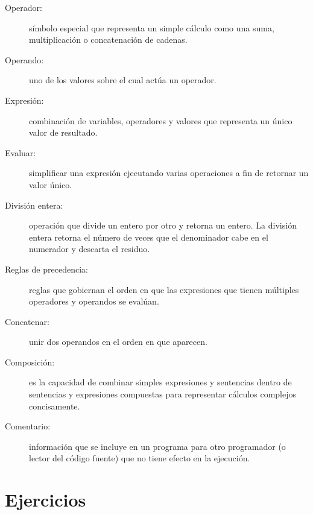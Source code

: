 \begin{description}
\item[Operador:]  símbolo especial que representa un simple cálculo como
una suma, multiplicación o concatenación de cadenas.

\item[Operando:]  uno de los valores sobre el cual actúa un operador.

\item[Expresión:]  combinación de variables, operadores y valores que 
representa un único valor de resultado.

\item[Evaluar:]  simplificar una expresión ejecutando varias operaciones a fin
de retornar un valor único.

\item[División entera:]  operación que divide un entero por otro
y retorna un entero. La división entera retorna el número de veces que 
el denominador cabe en el numerador y descarta el residuo.

\item[Reglas de precedencia:] reglas que gobiernan el orden en que
las expresiones que tienen múltiples operadores y operandos se evalúan.

\item[Concatenar:]  unir dos operandos en el orden en que aparecen.

\item[Composición:]  es la capacidad de combinar simples expresiones y sentencias
dentro de sentencias y expresiones compuestas para representar cálculos complejos
concisamente.

\item[Comentario:]  información que se incluye en un programa para 
otro programador (o lector del código fuente) que no tiene efecto en la ejecución.



\end{description}

\section{Ejercicios}


